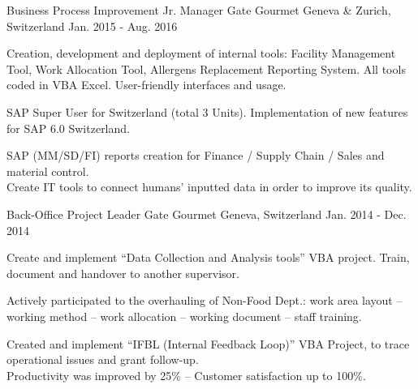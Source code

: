 


\begin{cventries}


\cventry
{Business Process Improvement Jr. Manager} %
{Gate Gourmet} %
{Geneva \& Zurich, Switzerland} %
{Jan. 2015 - Aug. 2016} %
{ %
\begin{cvitems}
\item {Creation, development and deployment of internal tools: Facility Management Tool, Work Allocation Tool, Allergens Replacement Reporting System. All tools coded in VBA Excel. User-friendly interfaces and usage.}
\item {SAP Super User for Switzerland (total 3 Units). Implementation of new features for SAP 6.0 Switzerland.}
\item {SAP (MM/SD/FI) reports creation for Finance / Supply Chain / Sales and material control.}
\\
\center\colorbox{mygray}{Create IT tools to connect humans’ inputted data in order to improve its quality.}
\end{cvitems}
}


\cventry
{Back-Office Project Leader} %
{Gate Gourmet} %
{Geneva, Switzerland} %
{Jan. 2014 - Dec. 2014} %
{ %
\begin{cvitems}
\item {Create and implement “Data Collection and Analysis tools” VBA project. Train, document and handover to another supervisor.}
\item {Actively participated to the overhauling of Non-Food Dept.: work area layout – working method – work allocation – working document – staff training.}
\item {Created and implement “IFBL (Internal Feedback Loop)” VBA Project, to trace operational issues and grant follow-up.}
\\
\center\colorbox{mygray}{Productivity was improved by 25\% – Customer satisfaction up to 100\%.}
\end{cvitems}
}


\end{cventries}
